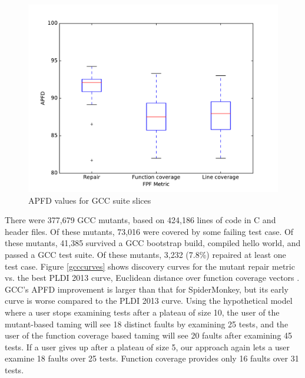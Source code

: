 \begin{figure}
  \centering
  \includegraphics[width=\columnwidth]{comparegcc}
  \caption{APFD values for GCC suite slices}
  \label{comparegcc}
\end{figure}%

There were 377,679 GCC mutants, based on 424,186 lines of code in C and header files. Of these mutants, 73,016 were covered by some failing test case.  Of these mutants, 41,385 survived a GCC bootstrap build, compiled hello world, and passed a GCC test suite.  Of these mutants, 3,232 (7.8\%) repaired at least one test case.  Figure \ref{gcccurves} shows discovery curves for the mutant repair metric vs. the best PLDI 2013 curve, Euclidean distance over function coverage vectors \cite{PLDI13}.  GCC's APFD improvement is larger than that for SpiderMonkey, but its early curve is worse compared to the PLDI 2013 curve.  Using the hypothetical model where a user stops examining tests after a plateau of size 10, the user of the mutant-based taming will see 18 distinct faults by examining 25 tests, and the user of the function coverage based taming will see 20 faults after examining 45 tests.  If a user gives up after a plateau of size 5, our approach again lets a user examine 18 faults over 25 tests.  Function coverage provides only 16 faults over 31 tests. 


